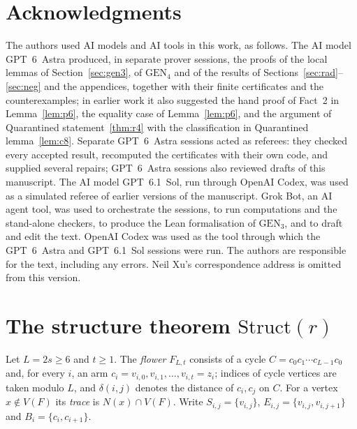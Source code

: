 \documentclass[11pt]{amsart}
\theoremstyle{definition}
\theoremstyle{remark}
\newcommand{\GEN}{\mathrm{GEN}}
\begin{document}
\section*{Acknowledgments}
The authors used AI models and AI tools in this work, as follows. The AI model GPT~6~Astra produced, in separate prover sessions, the proofs of the local lemmas of Section~\ref{sec:gen3}, of $\GEN_4$ and of the results of Sections~\ref{sec:rad}--\ref{sec:neg} and the appendices, together with their finite certificates and the counterexamples; in earlier work it also suggested the hand proof of Fact~2 in Lemma~\ref{lem:p6}, the equality case of Lemma~\ref{lem:p6}, and the argument of Quarantined statement~\ref{thm:r4} with the classification in Quarantined lemma~\ref{lem:c8}. Separate GPT~6~Astra sessions acted as referees: they checked every accepted result, recomputed the certificates with their own code, and supplied several repairs; GPT~6~Astra sessions also reviewed drafts of this manuscript. The AI model GPT~6.1~Sol, run through OpenAI Codex, was used as a simulated referee of earlier versions of the manuscript. Grok Bot, an AI agent tool, was used to orchestrate the sessions, to run computations and the stand-alone checkers, to produce the Lean formalisation of $\GEN_3$, and to draft and edit the text. OpenAI Codex was used as the tool through which the GPT~6~Astra and GPT~6.1~Sol sessions were run. The authors are responsible for the text, including any errors. Neil Xu's correspondence address is omitted from this version.

\appendix

\section{The structure theorem \texorpdfstring{$\mathrm{Struct}(r)$}{Struct(r)}}\label{app:struct}

Let $L=2s\ge6$ and $t\ge1$. The \emph{flower} $F_{L,t}$ consists of a cycle $C=c_0c_1\cdots c_{L-1}c_0$ and, for every $i$, an arm $c_i=v_{i,0},v_{i,1},\dots,v_{i,t}=z_i$; indices of cycle vertices are taken modulo $L$, and $\delta(i,j)$ denotes the distance of $c_i,c_j$ on $C$. For a vertex $x\notin V(F)$ its \emph{trace} is $N(x)\cap V(F)$. Write $S_{i,j}=\{v_{i,j}\}$, $E_{i,j}=\{v_{i,j},v_{i,j+1}\}$ and $B_i=\{c_i,c_{i+1}\}$.
\end{document}
